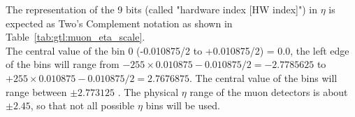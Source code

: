 
The representation of the 9 bits (called "hardware index [HW index]") in $\eta$ is expected as Two's Complement notation as shown in Table~\ref{tab:gtl:muon_eta_scale}.\\
The central value of the bin 0 (-0.010875/2 to +0.010875/2) = 0.0, the left edge of the bins will range from $-255 \times 0.010875 - 0.010875/2 = -2.7785625$ to $+255 \times 0.010875 - 0.010875/2 = 2.7676875$.
The central value of the bins will range between $\pm 2.773125$ . The physical $\eta$ range of the muon detectors is about $\pm2.45$, so that not all possible $\eta$ bins will be used.\\

